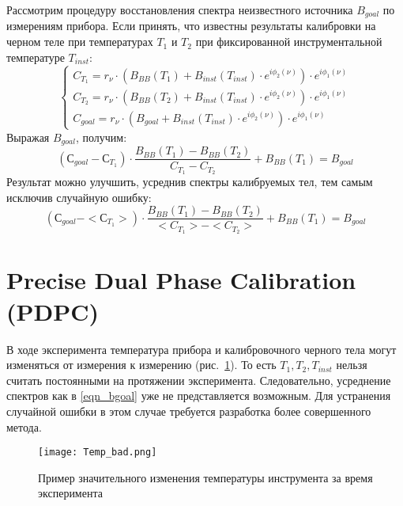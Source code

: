 \documentclass{mipt-thesis-bs}
\begin{document}
Рассмотрим процедуру восстановления спектра неизвестного источника $B_{goal}$ по измерениям прибора. Если принять, что известны результаты калибровки на черном теле при температурах $T_1$ и $T_2$ при фиксированной инструментальной температуре $T_{inst}$:   
\begin{equation}
\left\{\begin{array}{l}
	C_{T_1}=r_\nu \cdot \left(B_{BB}(T_1)+B_{inst}(T_{inst})\cdot e^{i\phi_2(\nu)}\right) \cdot e^{i\phi_1(\nu)}\\
	 C_{T_2}=r_\nu \cdot \left(B_{BB}(T_2)+B_{inst}(T_{inst})\cdot e^{i\phi_2(\nu)}\right) \cdot e^{i\phi_1(\nu)}\\
 	 C_{goal}=r_\nu \cdot \left(B_{goal}+B_{inst}(T_{inst})\cdot e^{i\phi_2(\nu)}\right) \cdot e^{i\phi_1(\nu)}
\end{array}\right.	
\end{equation}
Выражая $B_{goal}$, получим:
\begin{equation}
(С_{goal}-С_{T_1}) \cdot \frac{B_{BB}(T_1)-B_{BB}(T_2)}{C_{T_1}-C_{T_2}}+B_{BB}(T_1)=B_{goal}
\end{equation}
Результат можно улучшить, усреднив спектры калибруемых тел, тем самым исключив случайную ошибку:
\begin{equation}
	(С_{goal}-<С_{T_1}>) \cdot \frac{B_{BB}(T_1)-B_{BB}(T_2)}{<C_{T_1}>-<C_{T_2}>}+B_{BB}(T_1)=B_{goal} 
	\label{eqn_bgoal}
\end{equation}

	\section{Precise Dual Phase Calibration (PDPC)}
	
	В ходе эксперимента температура прибора и калибровочного черного тела могут изменяться от измерения к измерению (рис.~\ref{fig_tempdrift}). То есть $T_1,T_2,T_{inst}$ нельзя считать постоянными на протяжении эксперимента. Следовательно, усреднение спектров как в \eqref{eqn_bgoal} уже не представляется возможным. Для устранения случайной ошибки в этом случае требуется разработка более совершенного метода.
	
	\begin{figure}[h]
		\centering
		\texttt{[image: Temp\_bad.png]}
		\caption{Пример значительного изменения температуры инструмента за время эксперимента}
		\label{fig_tempdrift}
	\end{figure}
\end{document}
